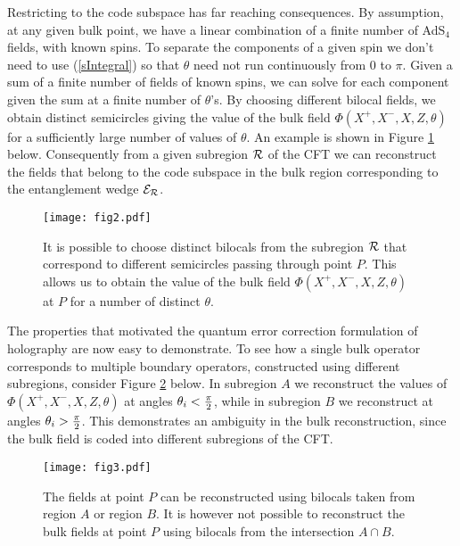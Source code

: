 \documentclass[a4paper,12pt]{article}
\begin{document}
Restricting to the code subspace has far reaching consequences.
By assumption, at any given bulk point, we have a linear combination of a finite number of AdS$_4$ fields, with known spins.
To separate the components of a given spin we don't need to use (\ref{sIntegral}) so that $\theta$ need not 
run continuously from $0$ to $\pi$.
Given a sum of a finite number of fields of known spins, we can solve for each component given the sum at 
a finite number of $\theta$'s.
By choosing different bilocal fields, we obtain distinct semicircles giving the value of the bulk field $\Phi(X^+,X^-,X,Z,\theta)$ 
for a sufficiently large number of values of $\theta$.
An example is shown in Figure \ref{fig:FinTheta} below.
Consequently from a given subregion ${\cal R}$ of the CFT we can reconstruct the fields that belong to the code subspace 
in the bulk region corresponding to the entanglement wedge ${\cal E}_{\cal R}$.
%
\begin{figure}[h]%
\begin{center}
\texttt{[image: fig2.pdf]}%
\caption{It is possible to choose distinct bilocals from the subregion ${\cal R}$ that correspond to different semicircles passing
through point $P$. This allows us to obtain the value of the bulk field $\Phi(X^+,X^-,X,Z,\theta)$ at $P$ for a number
of distinct $\theta$.}
\label{fig:FinTheta}
\end{center}
\end{figure}

The properties that motivated the quantum error correction formulation of holography are now easy to demonstrate.
To see how a single bulk operator corresponds to multiple boundary operators, constructed using different subregions,
consider Figure \ref{multiple} below.
In subregion $A$ we reconstruct the values of $\Phi(X^+,X^-,X,Z,\theta)$ at angles $\theta_i <{\pi\over 2}$, while in 
subregion $B$ we reconstruct at angles  $\theta_i >{\pi\over 2}$.
This demonstrates an ambiguity in the bulk reconstruction, since the bulk field is coded into different subregions of the CFT.  
%
\begin{figure}[h]%
\begin{center}
\texttt{[image: fig3.pdf]}%
\caption{The fields at point $P$ can be reconstructed using bilocals taken from region $A$ or region $B$.
It is however not possible to reconstruct the bulk fields at point $P$ using bilocals from the intersection $A\cap B$.}
\label{multiple}
\end{center}
\end{figure}
%
\end{document}
